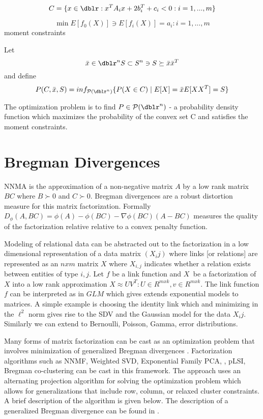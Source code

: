 \documentclass[a4paper]{article}
\theoremstyle{plain}
\theoremstyle{definition}
\theoremstyle{remark}
\numberwithin{equation}{section}
\begin{document}
\begin{equation*}  C = \{ x \in \dblr :  x^T A_i x + 2 b_{i}^{T} +c_i <0 : i=1, ...,m \} \end{equation*}

\begin{equation*}
\min E[f_0(X)] \ni E[f_i(X)] = a_i : i=1, ...,m
\end{equation*}
 moment constraints

Let
\begin{equation*}
 \bar{x} \in \dblr^n S \subset S^n \ni S \succeq \bar{x} \bar{x}^T
\end{equation*}
  and define
 \begin{equation*}
 P(C,\bar{x},S) = inf_{\mathcal{P}(\dblr^n)} \{P(X \in C) \mid E[X] = \bar{x} E[X X^T] = S \}
 \end{equation*}

The optimization problem is to find $ P \in \mathcal{P}(\dblr^n) $ - a probability density function which maximizes the probability of the convex set C and satisfies the moment constraints.



\section{Bregman Divergences}
NNMA is the approximation of a non-negative matrix $A$ by a low rank matrix $BC$ where $B\succ 0$ and $C\succ 0$.  Bregman divergences are a robust distortion measure for this matrix factorization.  Formally $D_\phi(A,BC)=\phi(A)-\phi(BC) - \nabla\phi(BC) (A-BC)$ measures the quality of the factorization relative relative to a convex penalty function.

Modeling of relational data can be abstracted out to the factorization in a low dimensional representation of a data matrix $(X_ij)$ where links [or relations] are represented as an $n x m$ matrix $X$ where $X_{i,j}$ indicates whether a relation exists between entities of type $i, j$.  Let $f$ be a link function and $X^{~}$ be a factorization of $X$ into a low rank approximation $X \approx U V^T : U \in R^{m x k}, v \in R^{m x k}$.  The link function $f$ can be interpreted as in $GLM$ which gives extends exponential models to matrices.  A simple example is choosing the identity link which and minimizing in the $\ell^2$ norm gives rise to the SDV and the Gaussian model for the data ${X_ij}$.  Similarly we can  extend to Bernoulli, Poisson, Gamma, error distributions.

Many forms of matrix factorization can be cast as an optimization problem that involves minimization of generalized Bregman divergences \cite{BDAUnifiedViewMatrixFactorizationModels}.  Factorization algorithms such as  NNMF, Weighted SVD, Exponential Family PCA, , pLSI, Bregman co-clustering \cite{CCBanerjee04ageneralized} can be cast in this framework. The approach uses an alternating projection algorithm for solving the optimization problem which allows for generalizations that include row, column, or relaxed cluster  constraints.  A brief description of the algorithm is given below.  The description of a generalized Bregman divergence can be found in \cite{BDGordon99approximatesolutions}.
\end{document}
